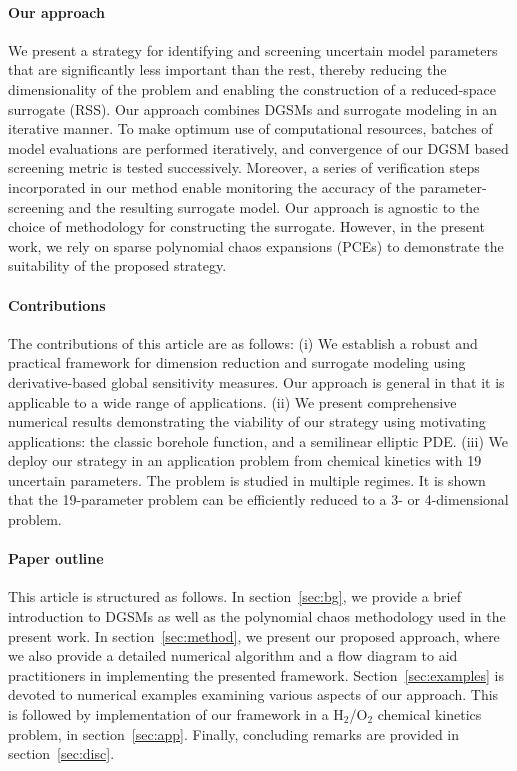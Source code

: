 \paragraph{Our approach}
We present a strategy for identifying and screening uncertain model parameters
that are significantly less important than the rest, thereby reducing the
dimensionality of the problem and enabling the construction of a reduced-space
surrogate (RSS).  Our approach combines DGSMs and surrogate modeling in an
iterative manner.  To make optimum use of computational resources, batches of
model evaluations are performed iteratively, and convergence of our DGSM based
screening metric is tested successively. Moreover, a series of verification steps
incorporated in our method enable monitoring the accuracy of the parameter-screening
and the resulting surrogate model.  Our approach is agnostic to the choice of
methodology for constructing the surrogate. However, in the present work, we
rely on sparse polynomial chaos expansions (PCEs) 
to demonstrate the suitability of the proposed strategy.  



\paragraph{Contributions}
The contributions of this article are as follows: (i) We establish a robust and
practical framework for dimension reduction and surrogate modeling using
derivative-based global sensitivity measures. Our
approach is general in that it is applicable to a wide range of applications.
(ii) We present comprehensive numerical results demonstrating the viability of
our strategy using motivating applications: the classic borehole
function, and a semilinear elliptic PDE.  (iii) We 
deploy our strategy in an application problem from chemical kinetics with 19
uncertain parameters. The problem is studied in multiple regimes.
It is shown that the 19-parameter problem can be efficiently reduced to a 3- 
or 4-dimensional problem.

\paragraph{Paper outline}
This article is structured as follows. In section~\ref{sec:bg}, we provide a
brief introduction to DGSMs as well as the polynomial chaos methodology used in
the present work.  In section~\ref{sec:method}, we present our proposed
approach, where we also provide a detailed numerical algorithm and a flow
diagram to aid practitioners in implementing the presented framework.
Section~\ref{sec:examples} is devoted to numerical examples
examining various aspects of our approach. This is followed by implementation
of our framework in a H$_2$/O$_2$ chemical kinetics problem, in section~\ref{sec:app}.
Finally, concluding remarks are provided in section~\ref{sec:disc}.


